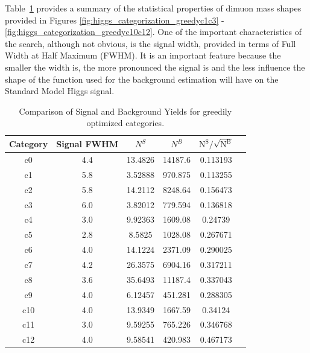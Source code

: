 
Table~\ref{tab:higgs_categorization_yields} provides a summary of the statistical properties of dimuon mass shapes provided in Figures \ref{fig:higgs_categorization_greedyc1c3} - \ref{fig:higgs_categorization_greedyc10c12}. One of the important characteristics of the search, although not obvious, is the signal width, provided in terms of Full Width at Half Maximum (FWHM). It is an important feature because the smaller the width is, the more pronounced the signal is and the less influence the shape of the function used for the background estimation will have on the Standard Model Higgs signal.
\begin{table}[htb]
  \caption{Comparison of Signal and Background Yields for greedily optimized categories.}
  \label{tab:higgs_categorization_yields}
  \begin{center}
    \begin{tabular}{|c|c|c|c|c|c|}
      \hline
      Category  & Signal FWHM & $N^{S}$ & $N^{B}$ & $\mathrm{N^S / \sqrt{N^B}}$ \\
      \hline
      c0 & 4.4 & 13.4826 & 14187.6 & 0.113193\\
      c1 & 5.8 & 3.52888 & 970.875 & 0.113255\\
      c2 & 5.8 & 14.2112 & 8248.64 & 0.156473\\
      c3 & 6.0 & 3.82012 & 779.594 & 0.136818\\
      c4 & 3.0 & 9.92363 & 1609.08 & 0.24739\\
      c5 & 2.8 & 8.5825  & 1028.08 & 0.267671\\
      c6 & 4.0 & 14.1224 & 2371.09 & 0.290025\\
      c7 & 4.2 & 26.3575 & 6904.16 & 0.317211\\
      c8 & 3.6 & 35.6493 & 11187.4 & 0.337043\\
      c9 & 4.0 & 6.12457 & 451.281 & 0.288305\\
      c10 & 4.0 & 13.9349 & 1667.59 & 0.34124\\
      c11 & 3.0 & 9.59255 & 765.226 & 0.346768\\
      c12 & 4.0 & 9.58541 & 420.983 & 0.467173\\
      \hline
    \end{tabular}
  \end{center}
\end{table}


